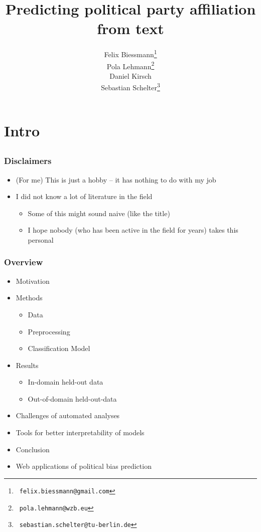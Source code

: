 \documentclass[]{beamer}
\institute[]{}
\title[]{
{
\vspace{1em}
\small
Predicting political party affiliation from text
}}
\author{
Felix Biessmann\thanks{~\tt felix.biessmann@gmail.com}\\
 Pola Lehmann\thanks{ ~{\tt pola.lehmann@wzb.eu} }\\
Daniel Kirsch\\
  Sebastian Schelter\thanks{~\tt sebastian.schelter@tu-berlin.de}\\
}
\begin{document}
\begin{frame} 
\titlepage 
\end{frame}	


\section{Intro}
\subsection{}

\begin{frame}\frametitle{Disclaimers}
\small
\begin{itemize}[<+->]
\item (For me) This is just a hobby -- it has nothing to do with my job
\item I did not know a lot of literature in the field 
\begin{itemize}
\item Some of this might sound naive (like the title)
\item I hope nobody (who has been active in the field for years) takes this personal
\end{itemize}
\end{itemize}
\end{frame}


\begin{frame}\frametitle{Overview}
\small
\begin{itemize}[<+->]
\item Motivation
\item Methods 
\begin{itemize}
\item Data
\item Preprocessing
\item Classification Model
\end{itemize}
\item Results
\begin{itemize}
\item In-domain held-out data
\item Out-of-domain held-out-data
\end{itemize}
\item Challenges of automated analyses
\item Tools for better interpretability of models
\item Conclusion
\item Web applications of political bias prediction
\end{itemize}
\end{frame}
\end{document}
